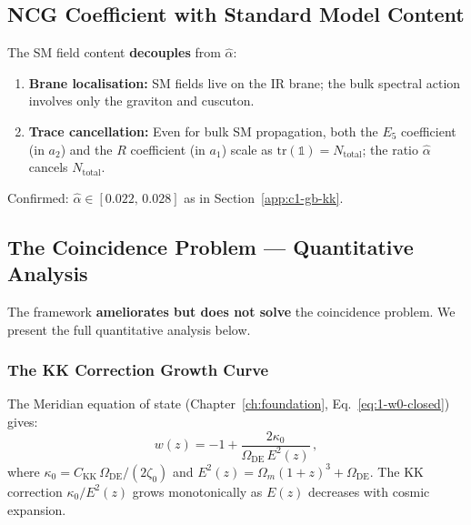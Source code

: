 \subsection{NCG Coefficient with Standard Model Content}

The SM field content \textbf{decouples} from $\hat{\alpha}$:
\begin{enumerate}
\item \textbf{Brane localisation:} SM fields live on the IR brane; the bulk spectral action involves only the graviton and cuscuton.
\item \textbf{Trace cancellation:} Even for bulk SM propagation, both the $E_5$ coefficient (in $a_2$) and the $R$ coefficient (in $a_1$) scale as $\mathrm{tr}(\mathbb{1}) = N_{\mathrm{total}}$; the ratio $\hat{\alpha}$ cancels $N_{\mathrm{total}}$.
\end{enumerate}
Confirmed: $\hat{\alpha} \in [0.022,\, 0.028]$ as in Section~\ref{app:c1-gb-kk}.

\subsection{The Coincidence Problem --- Quantitative Analysis}
\label{app:coincidence}

The framework \textbf{ameliorates but does not solve} the coincidence problem. We present the full quantitative analysis below.

\subsubsection{The KK Correction Growth Curve}

The Meridian equation of state (Chapter~\ref{ch:foundation}, Eq.~\ref{eq:1-w0-closed}) gives:
\begin{equation}
  w(z) = -1 + \frac{2\kappa_0}{\Omega_{\mathrm{DE}}\,E^2(z)}\,,
  \label{eq:app-coinc-wz}
\end{equation}
where $\kappa_0 = C_\mathrm{KK}\,\Omega_{\mathrm{DE}}/(2\zeta_0)$ and $E^2(z) = \Omega_m(1+z)^3 + \Omega_{\mathrm{DE}}$. The KK correction $\kappa_0/E^2(z)$ grows monotonically as $E(z)$ decreases with cosmic expansion.

